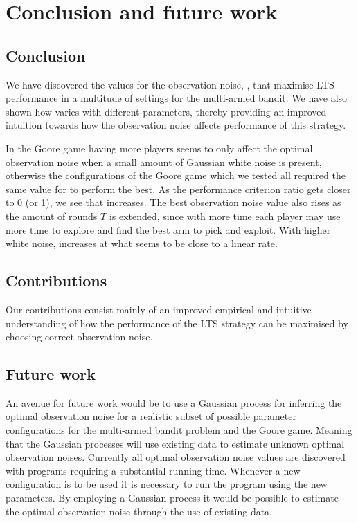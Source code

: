 \chapter{Conclusion and future work}
\label{ch:conclusion}

\section{Conclusion}

We have discovered the values for the observation noise, \ob{}, that maximise LTS performance in a multitude of settings for the multi-armed bandit.
We have also shown how \obstar{} varies with different parameters, thereby providing an improved intuition towards how the observation noise affects performance of this strategy.

In the Goore game having more players seems to only affect the optimal observation noise when a small amount of Gaussian white noise is present, otherwise the configurations of the Goore game which we tested all required the same value for \obstar{} to perform the best.
As the performance criterion ratio gets closer to 0 (or 1), we see that \obstar{} increases.
The best observation noise value also rises as the amount of rounds $T$ is extended, since with more time each player may use more time to explore and find the best arm to pick and exploit.
With higher white noise, \obstar{} increases at what seems to be close to a linear rate.

\section{Contributions}
Our contributions consist mainly of an improved empirical and intuitive understanding of how the performance of the LTS strategy can be maximised by choosing correct observation noise.


\section{Future work}
An avenue for future work would be to use a Gaussian process for inferring the optimal observation noise for a realistic subset of possible parameter configurations for the multi-armed bandit problem and the Goore game.
Meaning that the Gaussian processes will use existing data to estimate unknown optimal observation noises.
Currently all optimal observation noise values are discovered with programs requiring a substantial running time.
Whenever a new configuration is to be used it is necessary to run the program using the new parameters.
By employing a Gaussian process it would be possible to estimate the optimal observation noise through the use of existing data.

